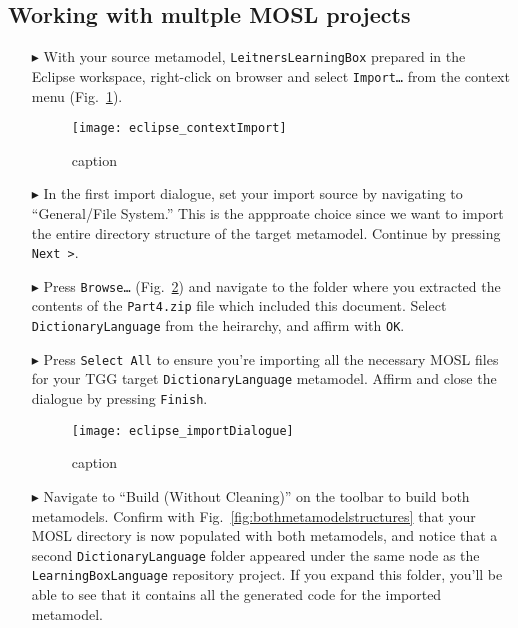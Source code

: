 \newpage
\subsection{Working with multple MOSL projects}
\texHeader
\label{sec:multiMOSL}


\begin{itemize}

\item[$\blacktriangleright$] With your source metamodel, \texttt{LeitnersLearningBox} prepared in the Eclipse workspace, right-click on
browser and select \texttt{Import\ldots} from the context menu (Fig.~\ref{fig:eclipseContextImport}).

\begin{figure}[htbp]
\begin{center}
  \texttt{[image: eclipse\_contextImport]}
  \caption{caption}
  \label{fig:eclipseContextImport}
\end{center}
\end{figure}

\item[$\blacktriangleright$] In the first import dialogue, set your import source by navigating to ``General/File System.'' This is the appproate choice since
we want to import the entire directory structure of the target metamodel. Continue by pressing \texttt{Next >}.

\item[$\blacktriangleright$] Press \texttt{Browse\ldots} (Fig.~\ref{fig:importFileSys}) and navigate to the folder where you extracted the contents of the
\texttt{Part4.zip} file which included this document. Select \texttt{DictionaryLanguage} from the heirarchy, and affirm with \texttt{OK}.

\item[$\blacktriangleright$] Press \texttt{Select All} to ensure you're importing all the necessary MOSL files for your TGG target \texttt{DictionaryLanguage}
metamodel. Affirm and close the dialogue by pressing \texttt{Finish}.

\begin{figure}[htbp]
\begin{center}
  \texttt{[image: eclipse\_importDialogue]}
  \caption{caption}
  \label{fig:importFileSys}
\end{center}
\end{figure}

\item[$\blacktriangleright$] Navigate to ``Build (Without Cleaning)'' on the toolbar to build both metamodels. Confirm with
Fig.~\ref{fig:bothmetamodelstructures} that your MOSL directory is now populated with both metamodels, and notice that a second \texttt{Dictionary\-Language}
folder appeared under the same node as the \texttt{LearningBoxLanguage} repository project. If you expand this folder, you'll be able to see that it contains
all the generated code for the imported metamodel.


\end{itemize}
